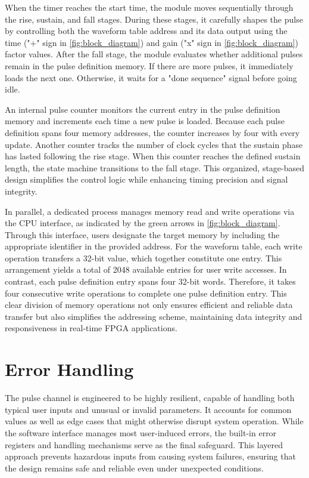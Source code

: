 When the timer reaches the start time, the module moves sequentially through the rise, sustain, and fall stages. During these stages, it carefully shapes the pulse by controlling both the waveform table address and its data output using the time ("+" sign in \autoref{fig:block_diagram}) and gain ("x" sign in \autoref{fig:block_diagram}) factor values. After the fall stage, the module evaluates whether additional pulses remain in the pulse definition memory. If there are more pulses, it immediately loads the next one. Otherwise, it waits for a "done sequence" signal before going idle.

An internal pulse counter monitors the current entry in the pulse definition memory and increments each time a new pulse is loaded. Because each pulse definition spans four memory addresses, the counter increases by four with every update. Another counter tracks the number of clock cycles that the sustain phase has lasted following the rise stage. When this counter reaches the defined sustain length, the state machine transitions to the fall stage. This organized, stage-based design simplifies the control logic while enhancing timing precision and signal integrity. 

In parallel, a dedicated process manages memory read and write operations via the CPU interface, as indicated by the green arrows in \autoref{fig:block_diagram}. Through this interface, users designate the target memory by including the appropriate identifier in the provided address. For the waveform table, each write operation transfers a 32-bit value, which together constitute one entry. This arrangement yields a total of 2048 available entries for user write accesses. In contrast, each pulse definition entry spans four 32-bit words. Therefore, it takes four consecutive write operations to complete one pulse definition entry. This clear division of memory operations not only ensures efficient and reliable data transfer but also simplifies the addressing scheme, maintaining data integrity and responsiveness in real-time FPGA applications.

\section{Error Handling}

The pulse channel is engineered to be highly resilient, capable of handling both typical user inputs and unusual or invalid parameters. It accounts for common values as well as edge cases that might otherwise disrupt system operation. While the software interface manages most user-induced errors, the built-in error registers and handling mechanisms serve as the final safeguard. This layered approach prevents hazardous inputs from causing system failures, ensuring that the design remains safe and reliable even under unexpected conditions.

